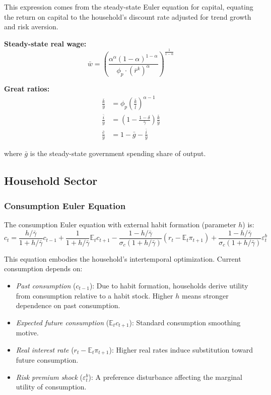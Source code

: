 \documentclass[12pt]{article}
\begin{document}
This expression comes from the steady-state Euler equation for capital, equating the return on capital to the household's discount rate adjusted for trend growth and risk aversion.

\textbf{Steady-state real wage:}
\begin{equation}
\bar{w} = \left(\frac{\alpha^\alpha(1-\alpha)^{1-\alpha}}{\phi_p \cdot (\bar{r}^k)^\alpha}\right)^{\frac{1}{1-\alpha}}
\end{equation}

\textbf{Great ratios:}
\begin{align}
\frac{\bar{k}}{\bar{y}} &= \phi_p\left(\frac{\bar{k}}{\bar{l}}\right)^{\alpha-1} \\
\frac{\bar{i}}{\bar{y}} &= \left(1-\frac{1-\delta}{\bar{\gamma}}\right)\frac{\bar{k}}{\bar{y}} \\
\frac{\bar{c}}{\bar{y}} &= 1 - \bar{g} - \frac{\bar{i}}{\bar{y}}
\end{align}

where $\bar{g}$ is the steady-state government spending share of output.

\subsection{Household Sector}

\subsubsection{Consumption Euler Equation}

The consumption Euler equation with external habit formation (parameter $h$) is:
\begin{equation}
\boxed{c_t = \frac{h/\bar{\gamma}}{1+h/\bar{\gamma}}c_{t-1} + \frac{1}{1+h/\bar{\gamma}}\mathbb{E}_t c_{t+1} - \frac{1-h/\bar{\gamma}}{\sigma_c(1+h/\bar{\gamma})}(r_t - \mathbb{E}_t\pi_{t+1}) + \frac{1-h/\bar{\gamma}}{\sigma_c(1+h/\bar{\gamma})}\varepsilon^b_t}
\label{eq:euler}
\end{equation}

This equation embodies the household's intertemporal optimization. Current consumption depends on:
\begin{itemize}
    \item \textit{Past consumption} ($c_{t-1}$): Due to habit formation, households derive utility from consumption relative to a habit stock. Higher $h$ means stronger dependence on past consumption.
    \item \textit{Expected future consumption} ($\mathbb{E}_t c_{t+1}$): Standard consumption smoothing motive.
    \item \textit{Real interest rate} ($r_t - \mathbb{E}_t\pi_{t+1}$): Higher real rates induce substitution toward future consumption.
    \item \textit{Risk premium shock} ($\varepsilon^b_t$): A preference disturbance affecting the marginal utility of consumption.
\end{itemize}
\end{document}
